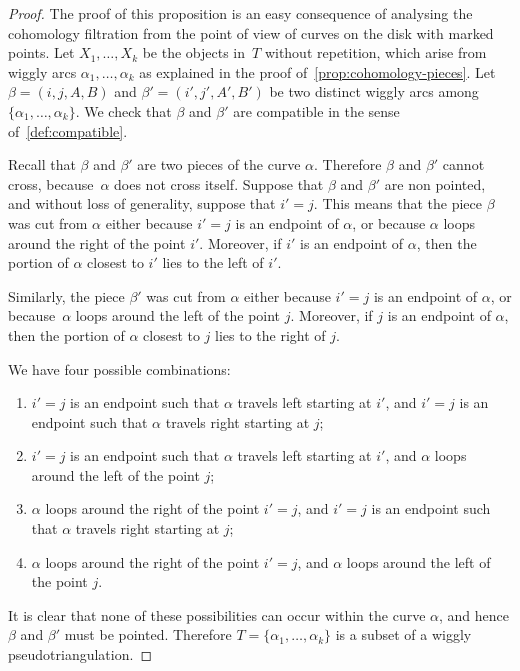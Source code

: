 \documentclass{amsart}
\theoremstyle{definition}
\begin{document}
\begin{proof}
  The proof of this proposition is an easy consequence of analysing the cohomology filtration from the point of view of curves on the disk with marked points.
  Let \(X_1, \ldots, X_k\) be the objects in~\(T\) without repetition, which arise from wiggly arcs \(\alpha_1, \ldots, \alpha_k\) as explained in the proof of~\cref{prop:cohomology-pieces}.
  Let \(\beta = (i,j,A,B)\) and \(\beta' = (i',j', A',B')\) be two distinct wiggly arcs among~\(\{\alpha_1, \ldots,\alpha_k\}\).
  We check that \(\beta\) and \(\beta'\) are compatible in the sense of~\cref{def:compatible}.
  
  Recall that \(\beta\) and \(\beta'\) are two pieces of the curve \(\alpha\).
  Therefore \(\beta\) and \(\beta'\) cannot cross, because~\(\alpha\) does not cross itself.
  Suppose that \(\beta\) and \(\beta'\) are non pointed, and without loss of generality, suppose that \(i' = j\).
  This means that the piece \(\beta\) was cut from \(\alpha\) either because \(i' = j\) is an endpoint of \(\alpha\), or because \(\alpha\) loops around the right of the point \(i'\).
  Moreover, if \(i'\) is an endpoint of \(\alpha\), then the portion of \(\alpha\) closest to \(i'\) lies to the left of \(i'\).
  
  Similarly, the piece \(\beta'\) was cut from \(\alpha\) either because \(i' = j\) is an endpoint of \(\alpha\), or because~\(\alpha\) loops around the left of the point \(j\).
  Moreover, if \(j\) is an endpoint of \(\alpha\), then the portion of \(\alpha\) closest to \(j\) lies to the right of \(j\).

\pagebreak
  We have four possible combinations:
  \begin{enumerate}
  \item \(i' = j\) is an endpoint such that \(\alpha\) travels left starting at \(i'\), and \(i' = j\) is an endpoint such that \(\alpha\) travels right starting at \(j\);
  \item \(i' = j\) is an endpoint such that \(\alpha\) travels left starting at \(i'\), and \(\alpha\) loops around the left of the point \(j\);
  \item \(\alpha\) loops around the right of the point \(i' = j\), and \(i' = j\) is an endpoint such that \(\alpha\) travels right starting at \(j\); 
  \item \(\alpha\) loops around the right of the point \(i' = j\), and \(\alpha\) loops around the left of the point \(j\).
  \end{enumerate}
  It is clear that none of these possibilities can occur within the curve \(\alpha\), and hence \(\beta\) and \(\beta'\) must be pointed.
  Therefore \(T = \{\alpha_1, \ldots, \alpha_k\}\) is a subset of a wiggly pseudotriangulation.


\end{proof}
\end{document}
